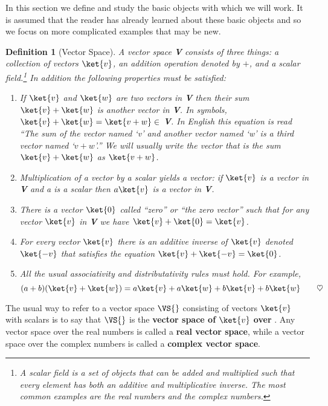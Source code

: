 In this section we define and study the basic objects with which we will work.
It is assumed that the reader has already learned about these basic objects and so we focus on more complicated examples that may be new.


\newtheorem{definition}{Definition}
\begin{definition}[Vector Space]
A vector space \textbf{V} consists of three things: a collection of vectors $\ket{v}$, an addition operation denoted by $+$, and a scalar field.\footnote{A scalar field is a set of objects that can be added and multiplied such that every element has both an additive and multiplicative inverse.  The most common examples are the real numbers and the complex numbers.}
In addition the following properties must be satisfied:
\begin{enumerate}
\item If $\ket{v}$ and $\ket{w}$ are two vectors in \textbf{V} then their sum $\ket{v} + \ket{w}$ is another vector in \textbf{V}.
In symbols, $\ket{v} + \ket{w} = \ket{v+w} \in$ \textbf{V}.
In English this equation is read ``The sum of the vector named `v' and another vector named `w' is a third vector named `$v+w$'.''
We will usually write the vector that is the sum $\ket{v} + \ket{w}$ as $\ket{v+w}$.
\item Multiplication of a vector by a scalar yields a vector: if $\ket{v}$ is a vector in \textbf{V} and a is a scalar then $a\ket{v}$ is a vector in \textbf{V}.
\item There is a vector $\ket{0}$ called ``zero'' or ``the zero vector'' such that for any vector $\ket{v}$ in \textbf{V} we have $\ket{v} + \ket{0} = \ket{v}$.
\item For every vector $\ket{v}$ there is an additive inverse of $\ket{v}$ denoted $\ket{-v}$ that satisfies the equation $\ket{v} + \ket{-v} = \ket{0}$.
\item All the usual associativity and distributativity rules must hold.
For example,
\begin{equation}
(a+b)(\ket{v} + \ket{w}) = a\ket{v} + a\ket{w} + b\ket{v} + b\ket{w} \qquad \heartsuit
\end{equation}
\end{enumerate}
\end{definition}

The usual way to refer to a vector space $\VS{}$ consisting of vectors $\ket{v}$ with scalars  is to say that $\VS{}$ is the \textbf{vector space of $\ket{v}$ over }.
Any vector space over the real numbers is called a \textbf{real vector space}, while a vector space over the complex numbers is called a \textbf{complex vector space}.

